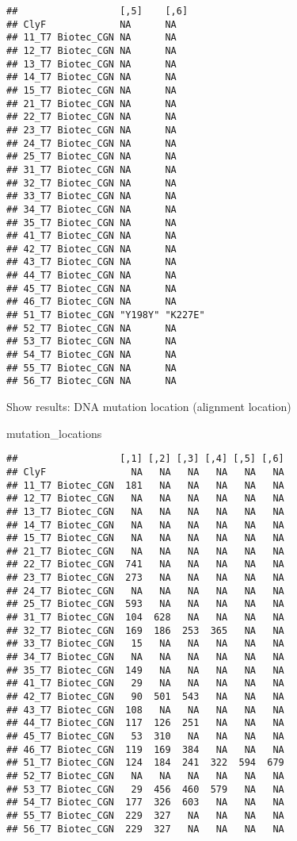 \documentclass[
]{article}
\newenvironment{Shaded}{\begin{snugshade}}{\end{snugshade}}
\newcommand{\NormalTok}[1]{#1}
\begin{document}
\begin{verbatim}
##                  [,5]    [,6]   
## ClyF             NA      NA     
## 11_T7 Biotec_CGN NA      NA     
## 12_T7 Biotec_CGN NA      NA     
## 13_T7 Biotec_CGN NA      NA     
## 14_T7 Biotec_CGN NA      NA     
## 15_T7 Biotec_CGN NA      NA     
## 21_T7 Biotec_CGN NA      NA     
## 22_T7 Biotec_CGN NA      NA     
## 23_T7 Biotec_CGN NA      NA     
## 24_T7 Biotec_CGN NA      NA     
## 25_T7 Biotec_CGN NA      NA     
## 31_T7 Biotec_CGN NA      NA     
## 32_T7 Biotec_CGN NA      NA     
## 33_T7 Biotec_CGN NA      NA     
## 34_T7 Biotec_CGN NA      NA     
## 35_T7 Biotec_CGN NA      NA     
## 41_T7 Biotec_CGN NA      NA     
## 42_T7 Biotec_CGN NA      NA     
## 43_T7 Biotec_CGN NA      NA     
## 44_T7 Biotec_CGN NA      NA     
## 45_T7 Biotec_CGN NA      NA     
## 46_T7 Biotec_CGN NA      NA     
## 51_T7 Biotec_CGN "Y198Y" "K227E"
## 52_T7 Biotec_CGN NA      NA     
## 53_T7 Biotec_CGN NA      NA     
## 54_T7 Biotec_CGN NA      NA     
## 55_T7 Biotec_CGN NA      NA     
## 56_T7 Biotec_CGN NA      NA
\end{verbatim}

Show results: DNA mutation location (alignment location)

\begin{Shaded}
\begin{Highlighting}[]
\NormalTok{mutation\_locations}
\end{Highlighting}
\end{Shaded}

\begin{verbatim}
##                  [,1] [,2] [,3] [,4] [,5] [,6]
## ClyF               NA   NA   NA   NA   NA   NA
## 11_T7 Biotec_CGN  181   NA   NA   NA   NA   NA
## 12_T7 Biotec_CGN   NA   NA   NA   NA   NA   NA
## 13_T7 Biotec_CGN   NA   NA   NA   NA   NA   NA
## 14_T7 Biotec_CGN   NA   NA   NA   NA   NA   NA
## 15_T7 Biotec_CGN   NA   NA   NA   NA   NA   NA
## 21_T7 Biotec_CGN   NA   NA   NA   NA   NA   NA
## 22_T7 Biotec_CGN  741   NA   NA   NA   NA   NA
## 23_T7 Biotec_CGN  273   NA   NA   NA   NA   NA
## 24_T7 Biotec_CGN   NA   NA   NA   NA   NA   NA
## 25_T7 Biotec_CGN  593   NA   NA   NA   NA   NA
## 31_T7 Biotec_CGN  104  628   NA   NA   NA   NA
## 32_T7 Biotec_CGN  169  186  253  365   NA   NA
## 33_T7 Biotec_CGN   15   NA   NA   NA   NA   NA
## 34_T7 Biotec_CGN   NA   NA   NA   NA   NA   NA
## 35_T7 Biotec_CGN  149   NA   NA   NA   NA   NA
## 41_T7 Biotec_CGN   29   NA   NA   NA   NA   NA
## 42_T7 Biotec_CGN   90  501  543   NA   NA   NA
## 43_T7 Biotec_CGN  108   NA   NA   NA   NA   NA
## 44_T7 Biotec_CGN  117  126  251   NA   NA   NA
## 45_T7 Biotec_CGN   53  310   NA   NA   NA   NA
## 46_T7 Biotec_CGN  119  169  384   NA   NA   NA
## 51_T7 Biotec_CGN  124  184  241  322  594  679
## 52_T7 Biotec_CGN   NA   NA   NA   NA   NA   NA
## 53_T7 Biotec_CGN   29  456  460  579   NA   NA
## 54_T7 Biotec_CGN  177  326  603   NA   NA   NA
## 55_T7 Biotec_CGN  229  327   NA   NA   NA   NA
## 56_T7 Biotec_CGN  229  327   NA   NA   NA   NA
\end{verbatim}
\end{document}
